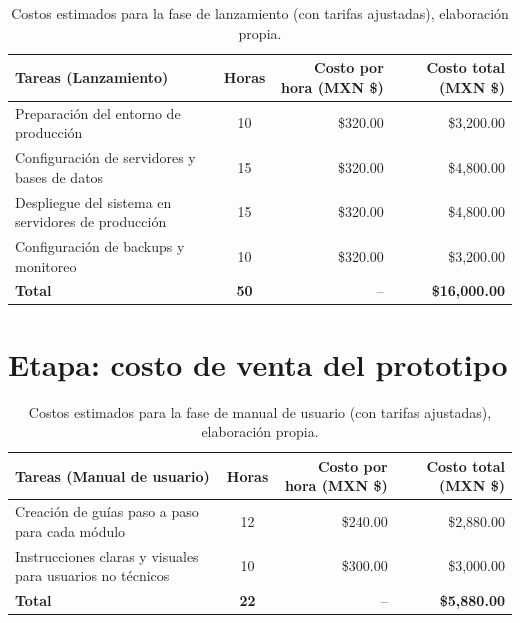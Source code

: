 \begin{table}[H]
	\centering
	\renewcommand{\arraystretch}{1.6}
	\setlength{\tabcolsep}{10pt}
	\Huge
	\begin{adjustbox}{max width=\textwidth}
		\begin{tabular}{|p{9.5cm}|c|r|r|}
			\hline
			\textbf{Tareas (Lanzamiento)} & \textbf{Horas} & \textbf{Costo por hora (MXN \$)} & \textbf{Costo total (MXN \$)} \\ \hline
			Preparación del entorno de producción & 10 & \$320.00 & \$3,200.00 \\ \hline
			Configuración de servidores y bases de datos & 15 & \$320.00 & \$4,800.00 \\ \hline
			Despliegue del sistema en servidores de producción & 15 & \$320.00 & \$4,800.00 \\ \hline
			Configuración de backups y monitoreo & 10 & \$320.00 & \$3,200.00 \\ \hline
			\textbf{Total} & \textbf{50} & -- & \textbf{\$16,000.00} \\ \hline
		\end{tabular}
	\end{adjustbox}
	\caption[Costos estimados para la fase de lanzamiento (con tarifas ajustadas)]{Costos estimados para la fase de lanzamiento (con tarifas ajustadas), elaboración propia.} 
	\label{tab:costos_lanzamiento_actualizado}
\end{table}

\section{Etapa: costo de venta del prototipo}

\begin{table}[H]
	\centering
	\renewcommand{\arraystretch}{1.6}
	\setlength{\tabcolsep}{10pt}
	\Huge
	\begin{adjustbox}{max width=\textwidth}
		\begin{tabular}{|p{9.5cm}|c|r|r|}
			\hline
			\textbf{Tareas (Manual de usuario)} & \textbf{Horas} & \textbf{Costo por hora (MXN \$)} & \textbf{Costo total (MXN \$)} \\ \hline
			Creación de guías paso a paso para cada módulo & 12 & \$240.00 & \$2,880.00 \\ \hline
			Instrucciones claras y visuales para usuarios no técnicos & 10 & \$300.00 & \$3,000.00 \\ \hline
			\textbf{Total} & \textbf{22} & -- & \textbf{\$5,880.00} \\ \hline
		\end{tabular}
	\end{adjustbox}
	\caption[Costos estimados para la fase de manual de usuario (con tarifas ajustadas)]{Costos estimados para la fase de manual de usuario (con tarifas ajustadas), elaboración propia.} 
	\label{tab:costos_manual_usuario_actualizado}
\end{table}

